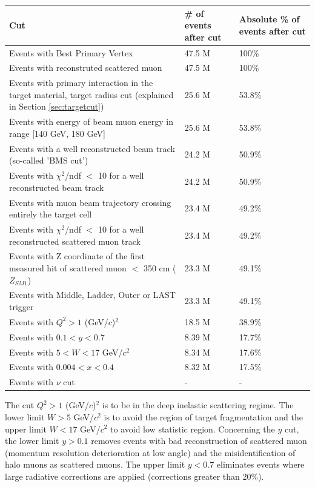 \begin{table}[!h]
  \centering
  \begin{tabular}{p{10cm} p{2cm} p{2cm}}
    \hline
    \hline
     Cut & \# of events after cut & Absolute \% of events after cut  \\
    \hline
    \hline
    Events with Best Primary Vertex & 47.5 M & 100\% \\
    Events with reconstruted scattered muon & 47.5 M & 100\% \\
    Events with primary interaction in the target material, target radius cut (explained in Section \ref{sec:targetcut}) & 25.6 M & 53.8\% \\
    Events with energy of beam muon energy in range [140 GeV, 180 GeV] & 25.6 M & 53.8\% \\
    Events with a well reconstructed beam track (so-called 'BMS cut') & 24.2 M & 50.9\% \\
    Events with $\chi^2$/ndf $<$ 10 for a well reconstructed beam track & 24.2 M & 50.9\% \\
    Events with muon beam trajectory crossing entirely the target cell & 23.4 M & 49.2\% \\
    Events with $\chi^2$/ndf $<$ 10 for a well reconstructed scattered muon track & 23.4 M & 49.2\% \\
    Events with Z coordinate of the first measured hit of scattered muon $<$ 350 cm ($Z_{SM1}$) & 23.3 M & 49.1\% \\
    Events with Middle, Ladder, Outer or LAST trigger & 23.3 M & 49.1\% \\
    Events with $Q^2>1$ (GeV/$c$)$^2$ & 18.5 M & 38.9\% \\
    Events with $0.1 < y < 0.7$ & 8.39 M & 17.7\% \\
    Events with $5 < W < 17$ GeV/$c^2$ & 8.34 M & 17.6\% \\
    Events with $0.004 < x < 0.4$ & 8.32 M & 17.5\% \\
    Events with $\nu$ cut & - & - \\
    \hline
    \hline
  \end{tabular}
\end{table}

The cut $Q^2>1$ (GeV/$c$)$^2$ is to be in the deep inelastic scattering regime. The lower limit $W > 5$ GeV/$c^2$ is to avoid the region of target fragmentation and the upper limit $W < 17$ GeV/$c^2$ to avoid low statistic region. Concerning the $y$ cut, the lower limit $y > 0.1$ removes events with bad reconstruction of scattered muon (momentum resolution deterioration at low angle) and the misidentification of halo muons as scattered muons. The upper limit $y < 0.7$ eliminates events where large radiative corrections are applied (corrections greater than 20\%).

